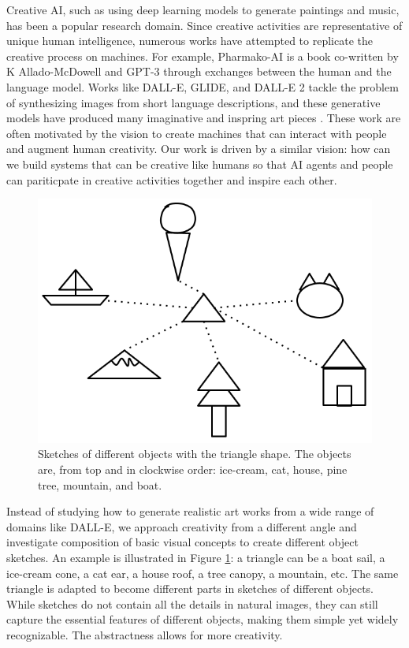 Creative AI, such as using deep learning models to generate paintings and music, has been a popular research domain. Since creative activities are representative of unique human intelligence, numerous works have attempted to replicate the creative process on machines.
For example, Pharmako-AI \citep{allado-mcdowell_okojie_2020} is a book co-written by K Allado-McDowell and GPT-3 \citep{gpt3} through exchanges between the human and the language model. 
Works like DALL-E, GLIDE, and DALL-E 2 tackle the problem of synthesizing images from short language descriptions, and these generative models have produced many imaginative and inspring art pieces \citep{dallePaper,glidePaper,dalle2Paper}.
These work are often motivated by the vision to create machines that can interact with people and augment human creativity.  
Our work is driven by a similar vision: how can we build systems that can be creative like humans so that AI agents and people can pariticpate in creative activities together and inspire each other. 

\begin{figure}[!htb]
\centering
\includegraphics[width=.3\linewidth]{introduction/sketch_composition.png}  
\caption{Sketches of different objects with the triangle shape. The objects are, from top and in clockwise order: ice-cream, cat, house, pine tree, mountain, and boat.}
\label{introduction.composition}
\end{figure}

Instead of studying how to generate realistic art works from a wide range of domains like DALL-E, we approach creativity from a different angle and investigate composition of basic visual concepts to create different object sketches.
An example is illustrated in Figure \ref{introduction.composition}: a triangle can be a boat sail, a ice-cream cone, a cat ear, a house roof, a tree canopy, a mountain, etc. The same triangle is adapted to become different parts in sketches of different objects. 
While sketches do not contain all the details in natural images, they can still capture the essential features of different objects, making them simple yet widely recognizable. The abstractness allows for more creativity. 

